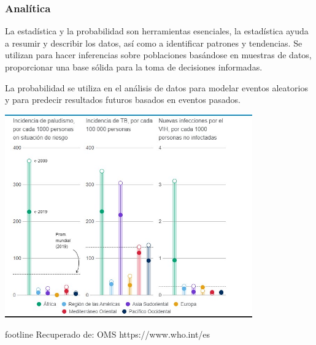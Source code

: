 \documentclass{beamer}
\begin{document}
\begin{frame}
\frametitle{Analítica}
\justify
La estadística y la probabilidad son herramientas esenciales, la estadística ayuda a resumir y describir los datos, así como a identificar patrones y tendencias. Se utilizan para hacer inferencias sobre poblaciones basándose en muestras de datos, proporcionar una base sólida para la toma de decisiones informadas.

\vspace{0.5cm}
\justify
La probabilidad se utiliza en el análisis de datos para modelar eventos aleatorios y para predecir resultados futuros basados en eventos pasados. 
\end{frame}

\begin{frame}
\centering
\includegraphics[width=0.8\textwidth]{oms.jpg}
\begin{beamercolorbox}[sep=1em,wd=\paperwidth,rightskip=0.5cm]{footline}
Recuperado de: OMS https://www.who.int/es
\end{beamercolorbox}
\end{frame}
\end{document}

